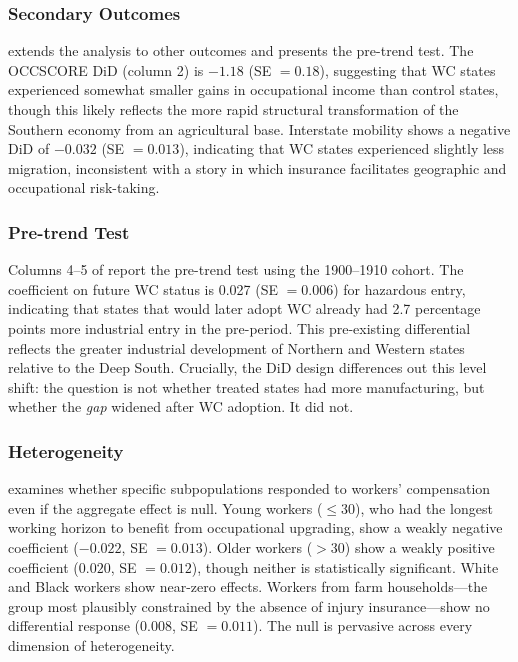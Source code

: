 \documentclass[12pt]{article}
\begin{document}


\subsubsection*{Secondary Outcomes}  extends the analysis to other outcomes and presents the pre-trend test. The OCCSCORE DiD (column 2) is $-1.18$ (SE $= 0.18$), suggesting that WC states experienced somewhat smaller gains in occupational income than control states, though this likely reflects the more rapid structural transformation of the Southern economy from an agricultural base. Interstate mobility shows a negative DiD of $-0.032$ (SE $= 0.013$), indicating that WC states experienced slightly less migration, inconsistent with a story in which insurance facilitates geographic and occupational risk-taking.

\subsubsection*{Pre-trend Test} Columns 4--5 of  report the pre-trend test using the 1900--1910 cohort. The coefficient on future WC status is 0.027 (SE $= 0.006$) for hazardous entry, indicating that states that would later adopt WC already had 2.7 percentage points more industrial entry in the pre-period. This pre-existing differential reflects the greater industrial development of Northern and Western states relative to the Deep South. Crucially, the DiD design differences out this level shift: the question is not whether treated states had more manufacturing, but whether the \textit{gap} widened after WC adoption. It did not.



\subsubsection*{Heterogeneity}  examines whether specific subpopulations responded to workers' compensation even if the aggregate effect is null. Young workers ($\leq 30$), who had the longest working horizon to benefit from occupational upgrading, show a weakly negative coefficient ($-0.022$, SE $= 0.013$). Older workers ($>30$) show a weakly positive coefficient ($0.020$, SE $= 0.012$), though neither is statistically significant. White and Black workers show near-zero effects. Workers from farm households---the group most plausibly constrained by the absence of injury insurance---show no differential response ($0.008$, SE $= 0.011$). The null is pervasive across every dimension of heterogeneity.
\end{document}
